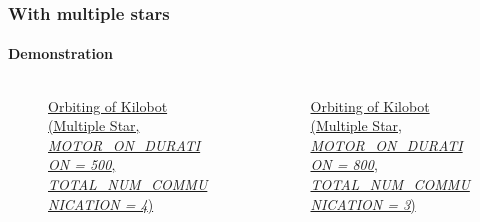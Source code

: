 \begin{frame}
\frametitle{With multiple stars}
\framesubtitle{Demonstration}
\begin{columns}[b]
	\begin{column}{0.5\textwidth}
		\begin{figure}[H]
        	\centering
        	\caption{\href{https://drive.google.com/file/d/1L9QUJOXNgUptjlVbOFi7709xdnPbLLnf/view}{Orbiting of Kilobot (Multiple Star, {\it MOTOR\_ON\_DURATION = 500}, {\it TOTAL\_NUM\_COMMUNICATION = 4})}}
        	\label{fig:planet-mstar-demo-1}
        \end{figure}
	\end{column}
	\begin{column}{0.5\textwidth}	
		\begin{figure}[H]
        	\centering
        	\caption{\href{https://drive.google.com/file/d/1uEPULMZj-hb8SObypaLxKwzrtphcz_XN/view}{Orbiting of Kilobot (Multiple Star, {\it MOTOR\_ON\_DURATION = 800}, {\it TOTAL\_NUM\_COMMUNICATION = 3})}}
        	\label{fig:planet-mstar-demo-2}
        \end{figure}
	\end{column}
\end{columns}
\end{frame}
